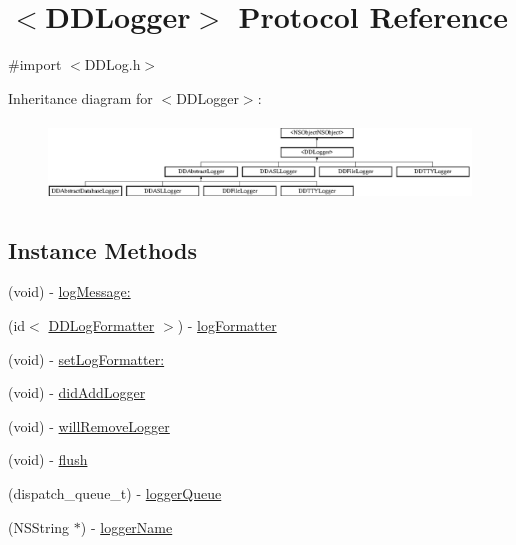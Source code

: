 \hypertarget{protocol_d_d_logger-p}{\section{$<$D\-D\-Logger$>$ Protocol Reference}
\label{protocol_d_d_logger-p}
}


{\ttfamily \#import $<$D\-D\-Log.\-h$>$}

Inheritance diagram for $<$D\-D\-Logger$>$\-:\begin{figure}[H]
\begin{center}
\leavevmode
\includegraphics[height=2.097378cm]{protocol_d_d_logger-p}
\end{center}
\end{figure}
\subsection*{Instance Methods}
\begin{DoxyCompactItemize}
\item 
(void) -\/ \hyperlink{protocol_d_d_logger-p_aa1c104584f8b5cd3c6840c93e537647e}{log\-Message\-:}
\item 
(id$<$ \hyperlink{protocol_d_d_log_formatter-p}{D\-D\-Log\-Formatter} $>$) -\/ \hyperlink{protocol_d_d_logger-p_a23281a33ff57cddf0bc7e58652b8217e}{log\-Formatter}
\item 
(void) -\/ \hyperlink{protocol_d_d_logger-p_af7ecf3d7e7f3f3f1fcdb9d4aba994128}{set\-Log\-Formatter\-:}
\item 
(void) -\/ \hyperlink{protocol_d_d_logger-p_a08ed6b9f325b85bb57578d86714a55df}{did\-Add\-Logger}
\item 
(void) -\/ \hyperlink{protocol_d_d_logger-p_a77000c17e64056fcb626efa85b7f7d61}{will\-Remove\-Logger}
\item 
(void) -\/ \hyperlink{protocol_d_d_logger-p_addbeafa905ae0e48ff20cdf6894676a1}{flush}
\item 
(dispatch\-\_\-queue\-\_\-t) -\/ \hyperlink{protocol_d_d_logger-p_ae5f2e2ba2d79e85d8df62e034151d4dd}{logger\-Queue}
\item 
(N\-S\-String $\ast$) -\/ \hyperlink{protocol_d_d_logger-p_ab3b082cd9feffe63baf3b240445004a2}{logger\-Name}
\end{DoxyCompactItemize}


